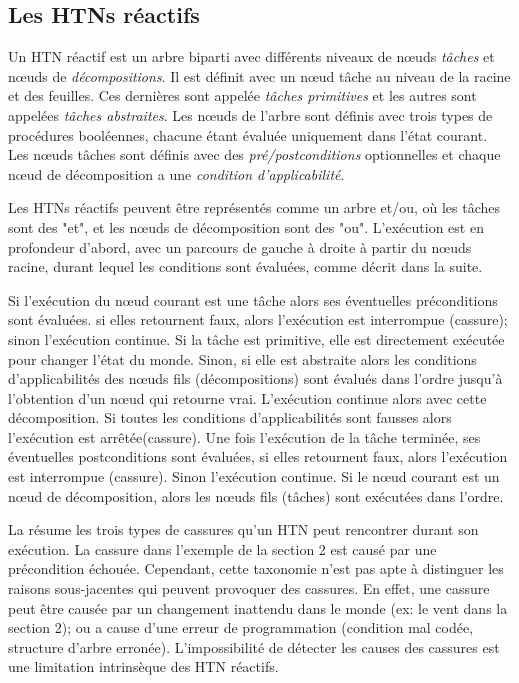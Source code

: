 \documentclass[a4paper,twoside,french]{article}
\begin{document}
		\subsection{Les HTNs réactifs}
		Un HTN réactif est un arbre biparti avec  différents niveaux de  n\oe uds {\em tâches} et   n\oe uds de {\em décompositions}. Il est définit avec un n\oe ud tâche au niveau de la racine et des feuilles. Ces dernières sont appelée {\em tâches primitives} et les autres sont appelées {\em tâches abstraites}. Les n\oe uds de l'arbre sont définis avec trois types de procédures booléennes, chacune étant évaluée uniquement dans l'état courant. Les nœuds tâches sont définis avec des {\em pré/postconditions} optionnelles et chaque nœud de décomposition a une {\em condition d'applicabilité}.
		\par Les HTNs réactifs peuvent être représentés comme un arbre et/ou, où les tâches sont des "et", et les nœuds de décomposition sont des "ou". L'exécution est en profondeur d'abord, avec un parcours de gauche à droite à partir du nœuds racine, durant lequel les conditions sont évaluées, comme décrit dans la suite. 
		\par Si l'exécution du nœud courant est une tâche alors ses éventuelles préconditions sont évaluées. si elles retournent faux, alors l'exécution est interrompue (cassure); sinon l'exécution continue. Si la tâche est primitive, elle est directement exécutée pour changer l'état du monde. Sinon, si elle est abstraite alors les conditions d'applicabilités des nœuds fils (décompositions) sont évalués dans l'ordre jusqu'à l'obtention d'un nœud qui retourne vrai. L'exécution continue alors avec cette décomposition. Si toutes les conditions d'applicabilités sont fausses alors  l'exécution est arrêtée(cassure). Une fois l'exécution de la tâche terminée, ses éventuelles postconditions sont évaluées, si elles retournent faux, alors l'exécution est interrompue (cassure). Sinon l'exécution continue. Si le nœud courant est un n\oe ud de décomposition, alors les nœuds fils (tâches) sont exécutées dans l'ordre. 
		\par La  résume les trois types de cassures qu'un HTN peut rencontrer durant son exécution. La cassure dans l'exemple de la section 2 est causé par une précondition échouée. Cependant, cette taxonomie n'est pas apte à distinguer les raisons sous-jacentes qui peuvent provoquer des cassures. En effet, une cassure peut être causée par un changement inattendu dans le monde (ex: le vent dans la section 2); ou a cause d'une erreur de programmation (condition mal codée, structure d'arbre erronée). L'impossibilité de détecter les causes des cassures est une limitation intrinsèque des HTN réactifs.
		
\end{document}
